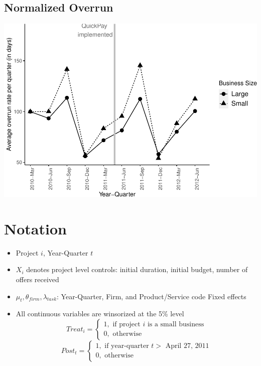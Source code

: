 \documentclass[
]{article}
\providecommand{\tightlist}{%
  \setlength{\itemsep}{0pt}\setlength{\parskip}{0pt}}
\begin{document}
\hypertarget{normalized-overrun}{%
\subsection{Normalized Overrun}\label{normalized-overrun}}

\includegraphics{qp_first_budget_overrun_mod_zero_files/figure-latex/normalized_plot-1.pdf}

\hypertarget{notation}{%
\section{Notation}\label{notation}}

\begin{itemize}
\tightlist
\item
  Project \(i\), Year-Quarter \(t\)
\item
  \(X_i\) denotes project level controls: initial duration, initial
  budget, number of offers received
\item
  \(\mu_t,\theta_{firm},\lambda_{task}\): Year-Quarter, Firm, and
  Product/Service code Fixed effects
\item
  All continuous variables are winsorized at the 5\% level
  \[ Treat_i = \begin{cases} 1, \text{ if project } i \text{ is a small business}\\
  0, \text{ otherwise} \end{cases}\]
  \[ Post_t = \begin{cases} 1, \text{ if year-quarter } t > \text{ April 27, 2011}\\
  0, \text{ otherwise} \end{cases}\]
\end{itemize}
\end{document}
